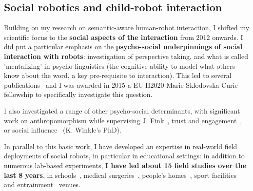 

\subsection{Social robotics and child-robot interaction}

Building on my research on semantic-aware human-robot
interaction, I shifted my scientific focus to the \textbf{social aspects of the
interaction} from 2012 onwards. I did put a particular emphasis on the \textbf{psycho-social
underpinnings of social interaction with robots}: 
investigation of perspective taking, and what is called 'mentalizing' in
psycho-linguistics (the cognitive ability to model what others know about the
word, a key pre-requisite to interaction). This led to several
publications~\autocite{ros2010which, warnier2012when, lemaignan2015mutual,
dillenbourg2016symmetry} and I was awarded in 2015 a EU H2020 Marie-Sklodovska
Curie fellowship to specifically investigate this question.

I also investigated a range of other psycho-social determinants, with
significant work on anthropomorphism while supervising J. Fink~\autocite{lemaignan2014cognitive,fink2014which,
fink2014dynamics,lemaignan2015youre}, trust and
engagement~\autocite{flook2019impact,lemaignan2015youre,fink2014which,wijnen2020performing},
or social influence~\autocite{irfan2018social, winkle2019effective} (K.
Winkle's PhD).


In parallel to this basic work, I have developed an expertise in real-world field
deployments of social robots, in particular in educational settings: in addition
to numerous lab-based experiments, \textbf{I have led about 15 field studies
over the last 8 years}, in schools~\autocite{hood2015when, jacq2016building,
baxter2015wider, kennedy2016cautious, chandra2015children, senft2018robots, wallbridge2018using},
medical surgeries~\autocite{lemaignan2016learning}, people's
homes~\autocite{mondada2015ranger},
sport facilities~\autocite{winkle2020couch,winkle2020insitu} and
entrainment~\autocite{lemaignan2012roboscopie} venues.


